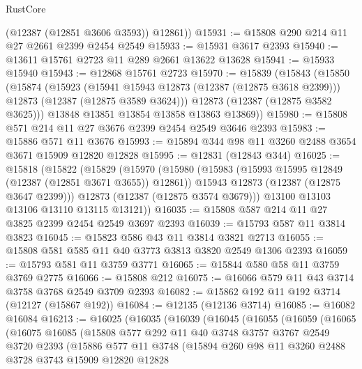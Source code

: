 \begin{lexlean}{RustCore}
\begin{coremodule}
        (@12387 (@12851 @3606 @3593))
        @12861))
@15931 := @15808 @290 @214 @11 @27 @2661 @2399 @2454 @2549
@15933 := @15931 @3617 @2393
@15940 := @13611 @15761 @2723 @11 @289 @2661 @13622 @13628
@15941 := @15933 @15940
@15943 := @12868 @15761 @2723
@15970 := @15839
    (@15843
      (@15850
        (@15874
          (@15923
            (@15941 @15943 @12873 (@12387 (@12875 @3618 @2399)))
            @12873
            (@12387 (@12875 @3589 @3624)))
          @12873
          (@12387 (@12875 @3582 @3625)))
        @13848
        @13851
        @13854
        @13858
        @13863
        @13869))
@15980 := @15808 @571 @214 @11 @27 @3676 @2399 @2454 @2549 @3646 @2393
@15983 := @15886 @571 @11 @3676
@15993 := @15894 @344 @98 @11 @3260 @2488 @3654 @3671 @15909 @12820 @12828
@15995 := @12831 (@12843 @344)
@16025 := @15818
    (@15822
      (@15829
        (@15970
          (@15980
            (@15983 (@15993 @15995 @12849 (@12387 (@12851 @3671 @3655)) @12861))
            @15943
            @12873
            (@12387 (@12875 @3647 @2399)))
          @12873
          (@12387 (@12875 @3574 @3679)))
        @13100
        @13103
        @13106
        @13110
        @13115
        @13121))
@16035 := @15808 @587 @214 @11 @27 @3825 @2399 @2454 @2549 @3697 @2393
@16039 := @15793 @587 @11 @3814 @3823
@16045 := @15823 @586 @43 @11 @3814 @3821 @2713
@16055 := @15808 @581 @585 @11 @40 @3773 @3813 @3820 @2549 @1306 @2393
@16059 := @15793 @581 @11 @3759 @3771
@16065 := @15844 @580 @58 @11 @3759 @3769 @2775
@16066 := @15808 @212
@16075 := @16066 @579 @11 @43 @3714 @3758 @3768 @2549 @3709 @2393
@16082 := @15862 @192 @11 @192 @3714 (@12127 (@15867 @192))
@16084 := @12135 (@12136 @3714)
@16085 := @16082 @16084
@16213 := @16025
    (@16035
      (@16039
        (@16045
          (@16055
            (@16059
              (@16065
                (@16075
                  @16085
                  (@15808
                    @577
                    @292
                    @11
                    @40
                    @3748
                    @3757
                    @3767
                    @2549
                    @3720
                    @2393
                    (@15886
                      @577
                      @11
                      @3748
                      (@15894
                        @260
                        @98
                        @11
                        @3260
                        @2488
                        @3728
                        @3743
                        @15909
                        @12820
                        @12828

\end{coremodule}
\end{lexlean}
